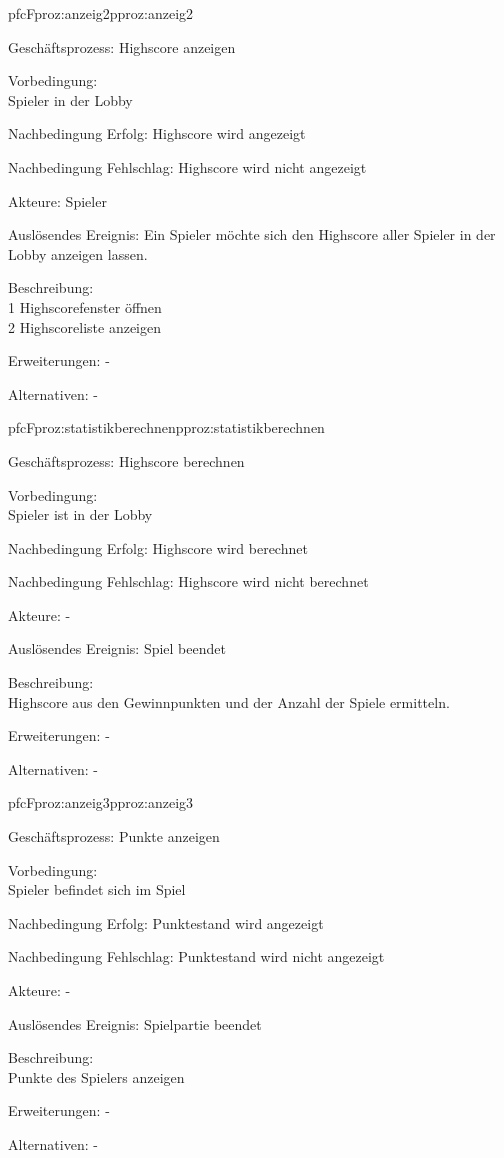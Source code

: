 \begin{description}[leftmargin=3em, style=sameline]
	\begin{php}{pfc}{F}{proz:anzeig2}{pproz:anzeig2}
		\item [Geschäftsprozess:] Highscore anzeigen
		\item [Vorbedingung:]\hfill\\
		Spieler in der Lobby
		\item [Nachbedingung Erfolg:] Highscore wird angezeigt
		\item [Nachbedingung Fehlschlag:] Highscore wird nicht angezeigt
		\item [Akteure:] Spieler
		\item [Auslösendes Ereignis:] Ein Spieler möchte sich den Highscore aller Spieler in der Lobby anzeigen lassen.
		\item [Beschreibung:]\hfill\\
		1 Highscorefenster öffnen  \\
		2 Highscoreliste anzeigen
		\item [Erweiterungen:] -
		\item [Alternativen:] - 
	\end{php}
	
	\begin{php}{pfc}{F}{proz:statistikberechnen}{pproz:statistikberechnen}
		\item [Geschäftsprozess:] Highscore berechnen
		\item [Vorbedingung:]\hfill\\
		Spieler ist in der Lobby 
		\item [Nachbedingung Erfolg:] Highscore wird berechnet
		\item [Nachbedingung Fehlschlag:] Highscore wird nicht berechnet
		\item [Akteure:] -
		\item [Auslösendes Ereignis:] Spiel beendet
		\item [Beschreibung:] \hfill\\
		Highscore aus den Gewinnpunkten und der Anzahl der Spiele ermitteln.
		\item [Erweiterungen:] -
		\item [Alternativen:] -
	\end{php}
	
	\begin{php}{pfc}{F}{proz:anzeig3}{pproz:anzeig3}
		\item [Geschäftsprozess:] Punkte anzeigen
		\item [Vorbedingung:]\hfill\\
		Spieler befindet sich im Spiel
		\item [Nachbedingung Erfolg:] Punktestand wird angezeigt
		\item [Nachbedingung Fehlschlag:] Punktestand wird nicht angezeigt
		\item [Akteure:] -
		\item [Auslösendes Ereignis:] Spielpartie beendet
		\item [Beschreibung:]\hfill\\
		Punkte des Spielers anzeigen
		\item [Erweiterungen:] -
		\item [Alternativen:] -
	\end{php}
	

\end{description}
